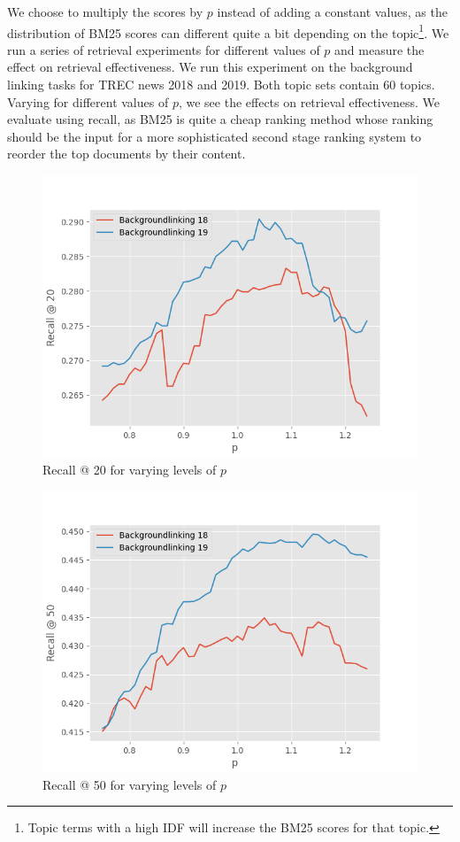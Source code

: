We choose to multiply the scores by $p$ instead of adding a constant values, as the distribution of BM25 scores can different quite a bit depending on the topic\footnote{Topic terms with a high IDF will increase the BM25 scores for that topic.}.
We run a series of retrieval experiments for different values of $p$ and measure the effect on retrieval effectiveness.  We run this experiment on the background linking tasks for TREC news 2018 and 2019. Both topic sets contain 60 topics. Varying for different values of $p$, we see the effects on retrieval effectiveness.  We evaluate using recall, as BM25 is quite a cheap ranking method whose ranking should be the input for a more sophisticated second stage ranking system to reorder the top documents by their content.  

\begin{figure}
	\centering
	\includegraphics[width=0.9\linewidth]{./imgs/recall-20-geesedb.png}
	\caption{Recall @ 20 for varying levels of $p$}
	\label{geesedb-recall-20}
\end{figure}

\begin{figure}
	\centering
	\includegraphics[width=0.9\linewidth]{./imgs/recall-50-geesedb.png}
	\caption{Recall @ 50 for varying levels of $p$}
	\label{geesedb-recall-50}
\end{figure}

